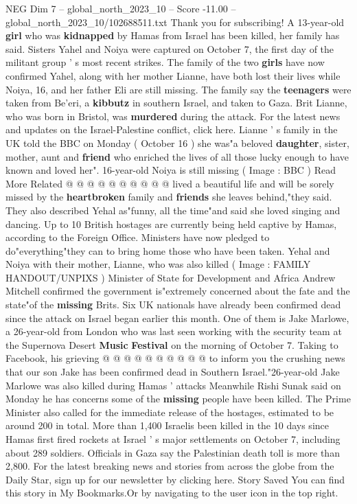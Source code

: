 \begin{textsample}{NEG Dim 7 – global\_north\_2023\_10 – Score -11.00 – global\_north\_2023\_10/102688511.txt}  \label{ex:f7_neg_028}
Thank you for subscribing!
A 13-year-old \textbf{girl} who was \textbf{kidnapped} by Hamas from Israel has been killed, her family has said.
Sisters Yahel and Noiya were captured on October 7, the first day of the militant group ' s most recent strikes.
The family of the two \textbf{girls} have now confirmed Yahel, along with her mother Lianne, have both lost their lives while Noiya, 16, and her father Eli are still missing.
The family say the \textbf{teenagers} were taken from Be'eri, a \textbf{kibbutz} in southern Israel, and taken to Gaza.
Brit Lianne, who was born in Bristol, was \textbf{murdered} during the attack.
For the latest news and updates on the Israel-Palestine conflict, click here.
Lianne ' s family in the UK told the BBC on Monday ( October 16 ) she was"a beloved \textbf{daughter}, sister, mother, aunt and \textbf{friend} who enriched the lives of all those lucky enough to have known and loved her". 16-year-old Noiya is still missing ( Image : BBC ) Read More Related @ @ @ @ @ @ @ @ @ @ lived a beautiful life and will be sorely missed by the \textbf{heartbroken} family and \textbf{friends} she leaves behind,"they said.
They also described Yehal as"funny, all the time"and said she loved singing and dancing.
Up to 10 British hostages are currently being held captive by Hamas, according to the Foreign Office.
Ministers have now pledged to do"everything"they can to bring home those who have been taken.
Yehal and Noiya with their mother, Lianne, who was also killed ( Image : FAMILY HANDOUT/UNPIXS ) Minister of State for Development and Africa Andrew Mitchell confirmed the government is"extremely concerned about the fate and the state"of the \textbf{missing} Brits.
Six UK nationals have already been confirmed dead since the attack on Israel began earlier this month.
One of them is Jake Marlowe, a 26-year-old from London who was last seen working with the security team at the Supernova Desert \textbf{Music} \textbf{Festival} on the morning of October 7.
Taking to Facebook, his grieving @ @ @ @ @ @ @ @ @ @ to inform you the crushing news that our son Jake has been confirmed dead in Southern Israel."26-year-old Jake Marlowe was also killed during Hamas ' attacks Meanwhile Rishi Sunak said on Monday he has concerns some of the \textbf{missing} people have been killed.
The Prime Minister also called for the immediate release of the hostages, estimated to be around 200 in total.
More than 1,400 Israelis been killed in the 10 days since Hamas first fired rockets at Israel ' s major settlements on October 7, including about 289 soldiers.
Officials in Gaza say the Palestinian death toll is more than 2,800.
For the latest breaking news and stories from across the globe from the Daily Star, sign up for our newsletter by clicking here.
Story Saved You can find this story in My Bookmarks.Or by navigating to the user icon in the top right.

\end{textsample}
